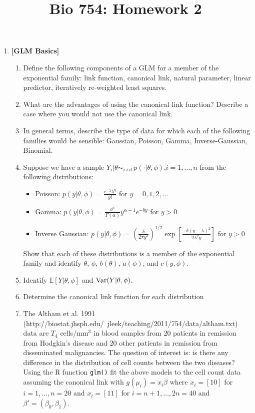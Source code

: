 \documentclass[12pt]{article}
\title{Bio 754: Homework 2}
\newcommand{\e}{\mathbb{E}}
\begin{document}
\maketitle
{}

\begin{enumerate}
\item \textbf{[GLM Basics]}

\begin{enumerate}
\item Define the following components of a GLM for a member of the exponential family: link function, canonical link, natural parameter, linear predictor, iteratively re-weighted least squares. 
\item What are the advantages of using the canonical link function? Describe a case where you would not use the canonical link. 
\item In general terms, describe the type of data for which each of the following families would be sensible: Gaussian, Poisson, Gamma, Inverse-Gaussian, Binomial. 
\item Suppose we have a sample $Y_i|\theta \sim_{i.i.d.} p(\cdot | \theta,\phi)$,$i=1,\ldots,n$ from the following distributions: 
\begin{itemize}
\item Poisson: $p(y | \theta,\phi) = \frac{e^{-\lambda} \lambda^y}{y!}$ for $y=0,1,2,\ldots$
\item Gamma: $p(y| \theta,\phi) = \frac{b^{\alpha}}{\Gamma(\alpha)}y^{\alpha-1}e^{-by}$ for $y > 0$
\item Inverse Gaussian: $p(y | \theta, \phi) = \left(\frac{\delta}{2\pi y^3}\right)^{1/2} \exp\left[\frac{-\delta(y-\lambda)^2}{2\lambda^2y}\right]$ for $y > 0$
\end{itemize}
Show that each of these distributions is a member of the exponential family and identify $\theta$, $\phi$, $b(\theta)$, $a(\phi)$, and $c(y,\phi)$. 
\item Identify $\e[Y|\theta,\phi]$ and ${\rm Var}(Y | \theta,\phi)$. 
\item Determine the canonical link function for each distribution
\item The Altham et al. 1991 (http://biostat.jhsph.edu/~jleek/teaching/2011/754/data/altham.txt) data are $T_4$ cells/mm$^3$ in blood samples from 20 patients in remission from Hodgkin's disease and 20 other patients in remission from disseminated malignancies. The question of interest is: is there any difference in the distribution of cell counts between the two diseases? Using the R function {\tt glm()} fit the above models to the cell count data assuming the canonical link with $g(\mu_i)  = x_i \beta$ where $x_i = [1 0]$ for $i = 1,\ldots, n=20$ and $x_i = [1 1]$ for $i = n+1,\ldots,2n=40$ and $\beta' = (\beta_0,\beta_1)$. 

\end{enumerate}
\end{enumerate}
\end{document}
